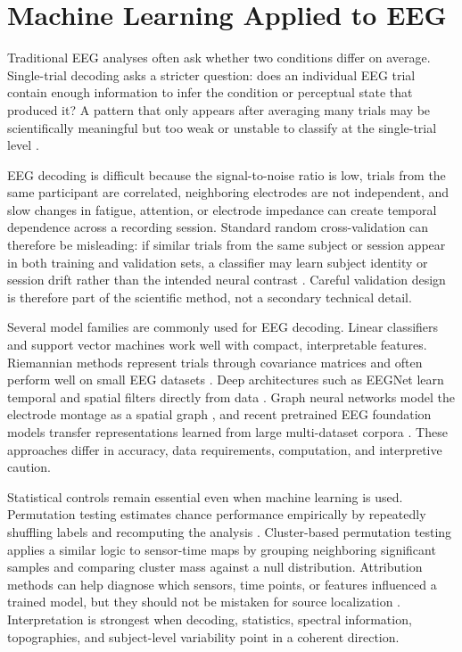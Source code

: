\documentclass[11pt,a4paper,chapterprefix=false,parskip=false]{scrreprt}
\begin{document}
\section{Machine Learning Applied to EEG}
Traditional EEG analyses often ask whether two conditions differ on average. Single-trial decoding asks a stricter question: does an individual EEG trial contain enough information to infer the condition or perceptual state that produced it? A pattern that only appears after averaging many trials may be scientifically meaningful but too weak or unstable to classify at the single-trial level \citep{lotte_review_2018}.

EEG decoding is difficult because the signal-to-noise ratio is low, trials from the same participant are correlated, neighboring electrodes are not independent, and slow changes in fatigue, attention, or electrode impedance can create temporal dependence across a recording session. Standard random cross-validation can therefore be misleading: if similar trials from the same subject or session appear in both training and validation sets, a classifier may learn subject identity or session drift rather than the intended neural contrast \citep{white_k-fold_2023, del_pup_role_2025}. Careful validation design is therefore part of the scientific method, not a secondary technical detail.

Several model families are commonly used for EEG decoding. Linear classifiers and support vector machines work well with compact, interpretable features. Riemannian methods represent trials through covariance matrices and often perform well on small EEG datasets \citep{lotte_review_2018, tibermacine_riemannian_2024}. Deep architectures such as EEGNet learn temporal and spatial filters directly from data \citep{lawhern_eegnet_2018}. Graph neural networks model the electrode montage as a spatial graph \citep{klepl_graph_2024}, and recent pretrained EEG foundation models transfer representations learned from large multi-dataset corpora \citep{jiang_large_2024, yang_are_2025}. These approaches differ in accuracy, data requirements, computation, and interpretive caution.

Statistical controls remain essential even when machine learning is used. Permutation testing estimates chance performance empirically by repeatedly shuffling labels and recomputing the analysis \citep{maris_nonparametric_2007}. Cluster-based permutation testing applies a similar logic to sensor-time maps by grouping neighboring significant samples and comparing cluster mass against a null distribution. Attribution methods can help diagnose which sensors, time points, or features influenced a trained model, but they should not be mistaken for source localization \citep{kobler_interpretation_2021, zhou_interpretable_2023, montavon_methods_2018, sundararajan_axiomatic_2017}. Interpretation is strongest when decoding, statistics, spectral information, topographies, and subject-level variability point in a coherent direction.
\end{document}
